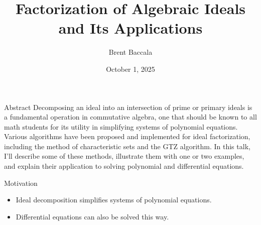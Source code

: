 \documentclass[11pt]{beamer}
\title[Factorization of Ideals]{Factorization of Algebraic Ideals and Its Applications}
\author{Brent Baccala}
\institute{\tt cosine@freesoft.org}
\date{October 1, 2025}
\begin{document}
\begin{frame}
  \titlepage


\begin{block}{Abstract}
\tiny
Decomposing an ideal into an intersection of prime or primary ideals is a fundamental operation in commutative algebra, one that should be known to all math students for its utility in simplifying systems of polynomial equations.  Various algorithms have been proposed and implemented for ideal factorization, including the method of characteristic sets and the GTZ algorithm.  In this talk, I'll describe some of these methods, illustrate them with one or two examples, and explain their application to solving polynomial and differential equations.
\end{block}

\end{frame}

\begin{frame}{Motivation}
\begin{itemize}
  \item Ideal decomposition simplifies systems of polynomial equations.
  \item Differential equations can also be solved this way.
\end{itemize}
\end{frame}

\end{document}
